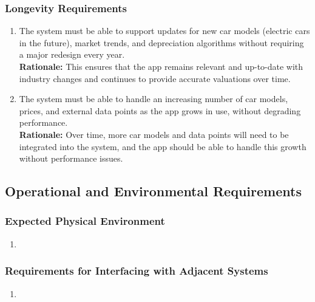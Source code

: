 \documentclass[]{article}
\begin{document}
\begin{enumerate}
\subsubsection{Longevity Requirements}
\label{ssub:longevity_requirements}
\begin{enumerate}[{PR-L}1.]
    \item The system must be able to support updates for new car models (electric cars in the future), market trends, and depreciation algorithms without requiring a major redesign every year.  \\
    \textbf{Rationale:} This ensures that the app remains relevant and up-to-date with industry changes and continues to provide accurate valuations over time.

    \item The system must be able to handle an increasing number of car models, prices, and external data points as the app grows in use, without degrading performance.  \\
    \textbf{Rationale:} Over time, more car models and data points will need to be integrated into the system, and the app should be able to handle this growth without performance issues.
\end{enumerate}


\subsection{Operational and Environmental Requirements}
\label{sub:operational_and_environmental_requirements}

\subsubsection{Expected Physical Environment}
\label{ssub:expected_physical_environment}
\begin{enumerate}[{OE-EPE}1. ]
	\item 
\end{enumerate}

\subsubsection{Requirements for Interfacing with Adjacent Systems}
\label{ssub:requirements_for_interfacing_with_adjacent_systems}
\begin{enumerate}[{OE-IA}1. ]
	\item 
\end{enumerate}


\end{enumerate}
\end{document}

